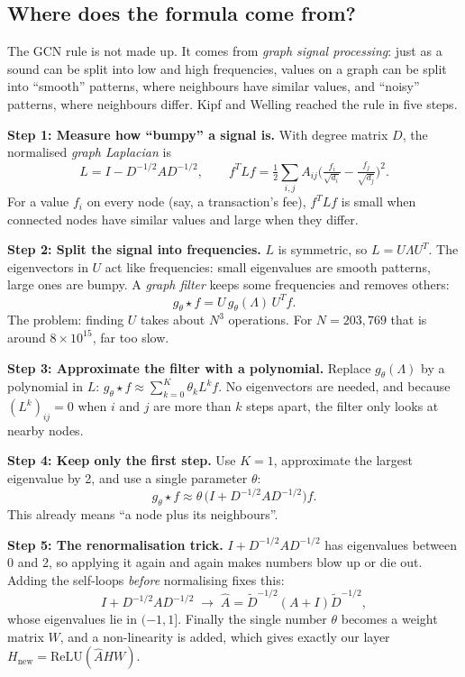 \documentclass[11pt,a4paper]{article}
\newcommand{\Ahat}{\hat{A}}
\begin{document}
\subsection{Where does the formula come from?}
The GCN rule is not made up. It comes from \emph{graph signal processing}: just as a sound can be split into low and high
frequencies, values on a graph can be split into ``smooth'' patterns, where neighbours have similar values, and ``noisy''
patterns, where neighbours differ. Kipf and Welling \cite{kipf} reached the rule in five steps.

\textbf{Step 1: Measure how ``bumpy'' a signal is.} With degree matrix $D$, the normalised \emph{graph Laplacian} is
\[
  L = I - D^{-1/2} A D^{-1/2}, \qquad
  f^{T} L f = \tfrac12 \sum_{i,j} A_{ij}\Big(\tfrac{f_i}{\sqrt{d_i}} - \tfrac{f_j}{\sqrt{d_j}}\Big)^2 .
\]
For a value $f_i$ on every node (say, a transaction's fee), $f^T L f$ is small when connected nodes have similar values and
large when they differ.

\textbf{Step 2: Split the signal into frequencies.} $L$ is symmetric, so $L = U\Lambda U^{T}$. The eigenvectors in $U$ act like
frequencies: small eigenvalues are smooth patterns, large ones are bumpy. A \emph{graph filter} keeps some frequencies and
removes others:
\[
  g_\theta \star f = U\, g_\theta(\Lambda)\, U^{T} f .
\]
The problem: finding $U$ takes about $N^3$ operations. For $N = 203{,}769$ that is around $8\times10^{15}$, far too slow.

\textbf{Step 3: Approximate the filter with a polynomial.} Replace $g_\theta(\Lambda)$ by a polynomial in $L$:
$g_\theta \star f \approx \sum_{k=0}^{K} \theta_k L^k f$. No eigenvectors are needed, and because $(L^k)_{ij} = 0$ when $i$ and $j$
are more than $k$ steps apart, the filter only looks at nearby nodes.

\textbf{Step 4: Keep only the first step.} Use $K = 1$, approximate the largest eigenvalue by 2, and use a single
parameter $\theta$:
\[
  g_\theta \star f \approx \theta\,\big(I + D^{-1/2} A D^{-1/2}\big) f .
\]
This already means ``a node plus its neighbours''.

\textbf{Step 5: The renormalisation trick.} $I + D^{-1/2}AD^{-1/2}$ has eigenvalues between 0 and 2, so applying it again and
again makes numbers blow up or die out. Adding the self-loops \emph{before} normalising fixes this:
\[
  I + D^{-1/2}AD^{-1/2} \;\longrightarrow\; \Ahat = \tilde D^{-1/2}(A + I)\tilde D^{-1/2},
\]
whose eigenvalues lie in $(-1, 1]$. Finally the single number $\theta$ becomes a weight matrix $W$, and a non-linearity is
added, which gives exactly our layer $H_{\text{new}} = \mathrm{ReLU}(\Ahat H W)$.
\end{document}
